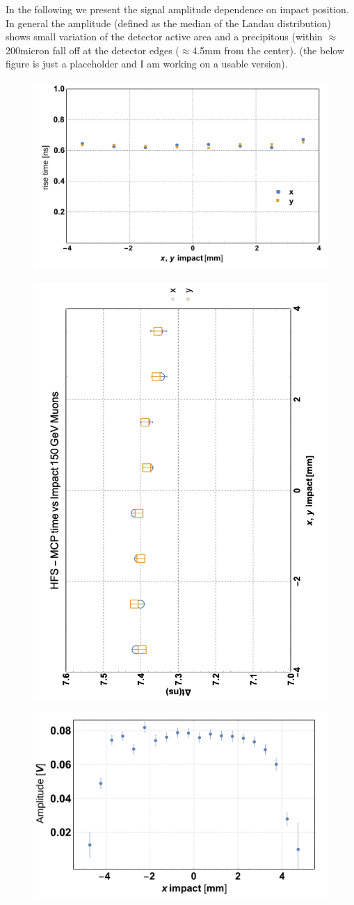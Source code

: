 \documentclass{article}
\begin{document}
In the following we present the signal amplitude dependence on impact position.
In general the amplitude (defined as the median of the Landau distribution) shows small variation of the detector active area and a precipitous (within $\approx$200micron fall off at the detector edges ($\approx$4.5mm from the center).
(the below figure is just a placeholder and I am working on a usable version).


\begin{figure}
  \centering
  \includegraphics[width = 0.6 \textwidth]{risetime8x8vsImpact}
  \caption{}
  \label{fig:risetime8x8impact}
\end{figure}

\begin{figure}
  \centering
  \includegraphics[width = 0.6 \textwidth]{toa8x8VsImpact}
  \caption{}
  \label{fig:toa8x8impact}
\end{figure}

\begin{figure}
  \centering
  \includegraphics[width = 0.6 \textwidth]{ampli8x8vsImpact}
  \caption{}
  \label{fig:ampli8x8impact}
\end{figure}
\end{document}
